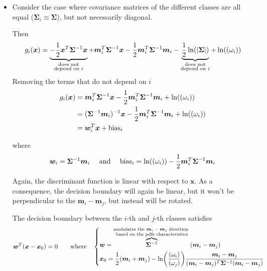 \documentclass[oneside,onecolumn]{report}
\let\P\relax
\DeclareMathOperator*{\P}{P}
\begin{document}
\begin{itemize}
    \item
    Consider the case where covariance matrices of the different classes are all equal ($\bm \Sigma_i \equiv \bm \Sigma$), but not necessarily diagonal.

    Then
    $$ g_i(\bm x) =
        \underbrace{-\frac{1}{2} \bm x^T \bm \Sigma^{-1} \bm x}_{\substack{\text{does not} \\ \text{depend on } i}}
        + \bm m_i^T \bm \Sigma^{-1} \bm x
        - \frac{1}{2} \bm m_i^T \bm \Sigma^{-1} \bm m_i
        - \underbrace{\frac{1}{2} \ln(\abs{\bm \Sigma})}_{\substack{\text{does not} \\ \text{depend on } i}}
        + \ln(\P(\omega_i)) $$
    Removing the terms that do not depend on $i$
    \begin{align*}
        g_i(\bm x)
        &= \bm m_i^T \bm \Sigma^{-1} \bm x - \frac{1}{2} \bm m_i^T \bm \Sigma^{-1} \bm m_i + \ln(\P(\omega_i)) \\
        &= (\bm \Sigma^{-1} \bm m_i)^{-1} \bm x - \frac{1}{2} \bm m_i^T \bm \Sigma^{-1} \bm m_i + \ln(\P(\omega_i)) \\
        &= \bm w_i^T \bm x + \text{bias}_i
    \end{align*}

    where
    $$ \bm w_i = \bm \Sigma^{-1} \bm m_i \quad \text{ and } \quad \text{bias}_i = \ln(\P(\omega_i)) - \frac{1}{2} \bm m_i^T \bm \Sigma^{-1} \bm m_i $$

    Again, the discriminant function is linear with respect to $\bm x$.
    As a consequence, the decision boundary will again be linear, but it won't be perpendicular to the $\bm m_i - \bm m_j$, but instead will be rotated.

    The decision boundary between the $i$-th and $j$-th classes satisfies
    $$ \bm w^T (\bm x - \bm x_0) = 0 \qquad \text{where} \quad \begin{dcases}
        \bm w = \overbrace{\bm \Sigma^{-1}}^{\substack{\text{modulates the $\bm m_i - \bm m_j$ direction } \\ \text{based on the pdfs characteristics}}} (\bm m_i - \bm m_j) \\
        \bm x_0 = \frac{1}{2} (\bm m_i + \bm m_j) - \ln(\frac{\P(\omega_i)}{\P(\omega_j)}) \frac{\bm m_i - \bm m_j}{(\bm m_i - \bm m_j)^T \bm \Sigma^{-1} (\bm m_i - \bm m_j)}
    \end{dcases} $$

    \vskip1cm


\end{itemize}
\end{document}
